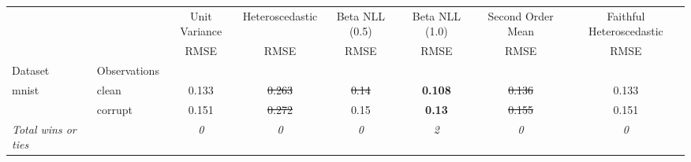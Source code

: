 \begin{tabular}{ll|c|c|c|c|c|c}
\toprule
{} & {} & {Unit Variance} & {Heteroscedastic} & {Beta NLL (0.5)} & {Beta NLL (1.0)} & {Second Order Mean} & {Faithful Heteroscedastic} \\
{} & {} & {RMSE} & {RMSE} & {RMSE} & {RMSE} & {RMSE} & {RMSE} \\
{Dataset} & {Observations} & {} & {} & {} & {} & {} & {} \\
\midrule
\multirow[t]{2}{*}{mnist} & clean & 0.133 & \sout{0.263} & \sout{0.14} & \textbf{0.108} & \sout{0.136} & 0.133 \\
 & corrupt & 0.151 & \sout{0.272} & 0.15 & \textbf{0.13} & \sout{0.155} & 0.151 \\
\textit{{Total wins or ties}} &  & \textit{0} & \textit{0} & \textit{0} & \textit{2} & \textit{0} & \textit{0} \\
\bottomrule
\end{tabular}
